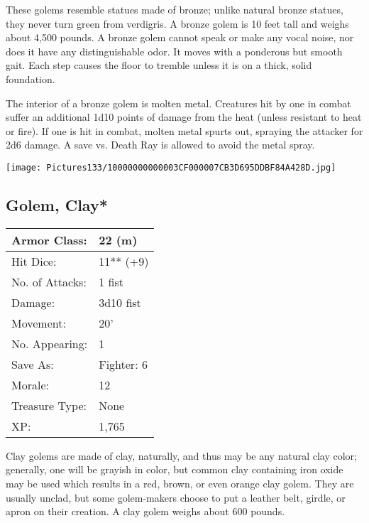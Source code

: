 \documentclass[a4paper,twoside,openany,10pt]{book}
\begin{document}
\begin{multicols}{2}
These golems resemble statues made of bronze; unlike natural bronze statues, they never turn green from verdigris. A bronze golem is 10 feet tall and weighs about 4,500 pounds. A bronze golem cannot speak or make any vocal noise, nor does it have any distinguishable odor. It moves with a ponderous but smooth gait. Each step causes the floor to tremble unless it is on a thick, solid foundation.

The interior of a bronze golem is molten metal. Creatures hit by one in combat suffer an additional 1d10 points of damage from the heat (unless resistant to heat or fire). If one is hit in combat, molten metal spurts out, spraying the attacker for 2d6 damage. A save vs. Death Ray is allowed to avoid the metal spray.

\begin{center}
	\texttt{[image: Pictures133/10000000000003CF000007CB3D695DDBF84A428D.jpg]}
\end{center}

\subsection*{Golem, Clay*}\label{golem-clay}

\begin{tabularx}{0.48\textwidth}{@{}lX@{}}
Armor Class: & 22 (m) \\\hline
Hit Dice: & 11** (+9) \\\hline
No. of Attacks: & 1 fist \\\hline
Damage: & 3d10 fist \\\hline
Movement: & 20' \\\hline
No. Appearing: & 1 \\\hline
Save As: & Fighter: 6 \\\hline
Morale: & 12 \\\hline
Treasure Type: & None \\\hline
XP: & 1,765 \\\hline
\end{tabularx}\medskip

Clay golems are made of clay, naturally, and thus may be any natural clay color; generally, one will be grayish in color, but common clay containing iron oxide may be used which results in a red, brown, or even orange clay golem. They are usually unclad, but some golem-makers choose to put a leather belt, girdle, or apron on their creation. A clay golem weighs about 600 pounds.


\end{multicols}
\end{document}
